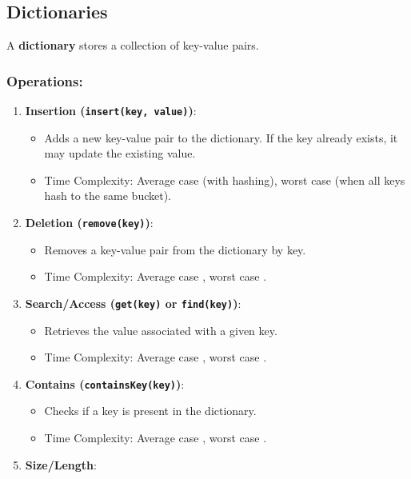 \newpage
\subsection{Dictionaries}
A \textbf{dictionary} stores a collection of key-value pairs. 

\subsubsection{Operations:}

\begin{enumerate}
    \item \textbf{Insertion (\texttt{insert(key,\ value)})}:
          \begin{itemize}
              \item Adds a new key-value pair to the dictionary. If the key already exists, it may update the existing value.
              \item Time Complexity: Average case  (with hashing), worst case  (when all keys hash to the same bucket).
          \end{itemize}
    \item \textbf{Deletion (\texttt{remove(key)})}:
          \begin{itemize}
              \item Removes a key-value pair from the dictionary by key.
              \item Time Complexity: Average case , worst case .
          \end{itemize}
    \item \textbf{Search/Access (\texttt{get(key)} or \texttt{find(key)})}:
          \begin{itemize}
              \item Retrieves the value associated with a given key.
              \item Time Complexity: Average case , worst case .
          \end{itemize}
    \item \textbf{Contains (\texttt{containsKey(key)})}:
          \begin{itemize}
              \item Checks if a key is present in the dictionary.
              \item Time Complexity: Average case , worst case .
          \end{itemize}
    \item \textbf{Size/Length}:

\end{enumerate}
